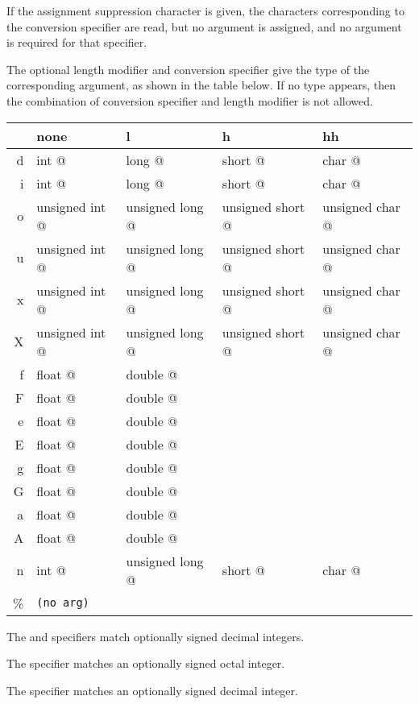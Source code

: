 If the assignment suppression character \code{*} is given, the
characters corresponding to the conversion specifier are read, but no
argument is assigned, and no argument is required for that specifier.

The optional length modifier and conversion specifier give the type of
the corresponding argument, as shown in the table below.  If no type
appears, then the combination of conversion specifier and length
modifier is not allowed.

\begin{tt}
\begin{tabular}{r|llll}
  & none           & l               & h                &  hh\\\hline
d & int @          & long @          & short @          & char @ \\
i & int @          & long @          & short @          & char @ \\
o & unsigned int @ & unsigned long @ & unsigned short @ & unsigned char @ \\
u & unsigned int @ & unsigned long @ & unsigned short @ & unsigned char @ \\
x & unsigned int @ & unsigned long @ & unsigned short @ & unsigned char @ \\
X & unsigned int @ & unsigned long @ & unsigned short @ & unsigned char @ \\
f & float @        & double @ \\
F & float @        & double @ \\
e & float @        & double @ \\
E & float @        & double @ \\
g & float @        & double @ \\
G & float @        & double @ \\
a & float @        & double @ \\
A & float @        & double @ \\
n & int @          & unsigned long @ & short @          & char @ \\
\% & \texttt{(no arg)}
\end{tabular}
\end{tt}

The  and  specifiers match optionally signed decimal
integers.

The  specifier matches an optionally signed octal integer.

The  specifier matches an optionally signed decimal integer.

